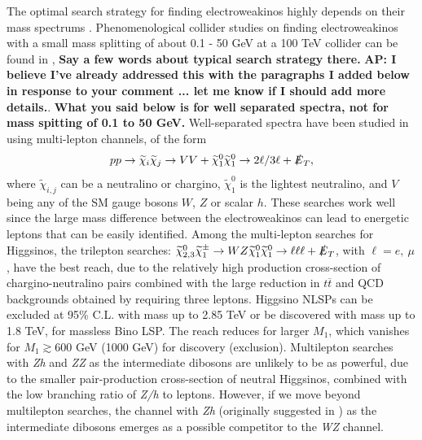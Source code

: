 \documentclass[a4paper,11pt]{article}
\newcommand{\Shufang}[1]{{\bf\color{Maroon}  #1}}
\newcommand{\Adarsh}[1]{{\bf\color{RoyalBlue} AP: #1}}
\newcommand{\met}{{\slashed{E}_T}}
\begin{document}
The optimal search strategy for finding electroweakinos   highly depends on
  their mass spectrums \cite{Han:2013kza}.  Phenomenological collider studies on finding electroweakinos with a small mass splitting of about 0.1 - 50 GeV at a 100 TeV collider can be
found in \cite{Low:2014cba, Bramante:2014tba, Berlin:2015aba, Cirelli:2014dsa},
\Shufang{Say a few words about typical search strategy there.} \Adarsh{I
believe I've already addressed this with the paragraphs I added below in response
to your comment ... let me know if I should add more details.}. \Shufang{What you said below is for well separated spectra, not for mass spitting of 0.1 to 50 GeV.}
Well-separated spectra have been studied in \cite{Gori:2014oua,
Acharya:2014pua} using
multi-lepton channels, of the form 
\begin{align}
  pp\rightarrow \widetilde{\chi}_i\widetilde{\chi}_j\rightarrow VV +
  \widetilde{\chi}_1^0\widetilde{\chi}_1^0\rightarrow 2\ell/3\ell +  
  \met,
\end{align}
where $\widetilde{\chi}_{i,j}$ can be a neutralino or chargino,
$\widetilde{\chi}_1^0$ is the lightest neutralino, and $V$ being any of the SM gauge bosons $W$, $Z$ or scalar $h$.  These searches work well since
the large mass difference between the electroweakinos can lead to energetic
leptons that can be easily identified. Among the multi-lepton searches for
Higgsinos, the trilepton searches: $\widetilde\chi_{2,3}^0\widetilde\chi_1^\pm\rightarrow WZ\widetilde\chi_1^0\widetilde\chi_1^0\rightarrow \ell\ell\ell + \met$, with $\ell=e, \ \mu$,  have the best reach, due to the relatively high production cross-section of
chargino-neutralino pairs combined with the large reduction in $t\overline{t}$
and QCD backgrounds obtained by requiring three leptons.  Higgsino NLSPs can be excluded at 95\% C.L. with mass up to 2.85 TeV or be discovered with  mass up to 1.8 TeV, for massless Bino LSP.   The reach reduces for larger $M_1$, which vanishes for $M_1\gtrsim 600$ GeV (1000 GeV) for discovery (exclusion).    Multilepton searches
with \emph{Zh} and \emph{ZZ} as the intermediate dibosons are unlikely to be as powerful,
due to the smaller pair-production cross-section of neutral Higgsinos, combined
with the low branching ratio of \emph{Z/h} to leptons. However, if we move beyond
multilepton searches, the channel with \emph{Zh} (originally suggested in
\cite{Han:2013kza}) as the intermediate dibosons emerges as a possible
competitor to the \emph{WZ} channel.  
\end{document}
